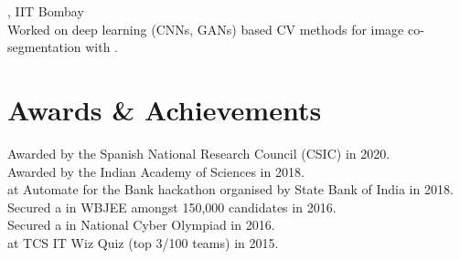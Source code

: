 \documentclass[mm]{simple_style}
\begin{document}
\begin{resume}
\vspace{-4.5ex}

, IIT Bombay \\
Worked on deep learning (CNNs, GANs) based CV methods for image co-segmentation with .\\







\vspace{-2ex}
\sectionline


\section{Awards \& Achievements}
Awarded  by the Spanish National Research Council (CSIC) in 2020.\\
Awarded  by the Indian Academy of Sciences in 2018.\\
 at Automate for the Bank hackathon organised by State Bank of India in 2018.\\
Secured a  in WBJEE amongst 150,000 candidates in 2016.\\
Secured a  in National Cyber Olympiad in 2016.\\
 at TCS IT Wiz Quiz (top 3/100 teams) in 2015.


\end{resume}
\end{document}
